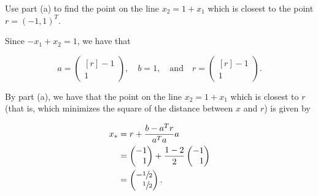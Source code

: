 Use part (a) to find the point on the line $x_2 = 1 + x_1$ which is closest to the point $r = (-1, 1)^T$.

\begin{solution}
    Since $-x_1 + x_2 = 1$, we have that 

    $$
    a = \begin{pmatrix*}[r]
        -1 \\
        1
    \end{pmatrix*}, \quad b = 1, \quad \text{and} \quad r = \begin{pmatrix*}[r]
        -1 \\
        1
    \end{pmatrix*}.
    $$

     By part (a), we have that the point on the line $x_2 = 1 + x_1$ which is closest to $r$ (that is, which minimizes
     the square of the distance between $x$ and $r$) is given by

     \begin{align*}
        x_* &= r + \frac{b - a^T r}{a^T a} a \\
            &= \begin{pmatrix*}[r]
                 -1 \\
                  1
               \end{pmatrix*} + \frac{1 - 2}{2} \begin{pmatrix*}[r]
                 -1 \\
                  1
               \end{pmatrix*} \\
            &= \begin{pmatrix*}[r]
                 -\sfrac{1}{2} \\
                  \sfrac{1}{2}
               \end{pmatrix*}.
     \end{align*}

    \ \\
\end{solution}